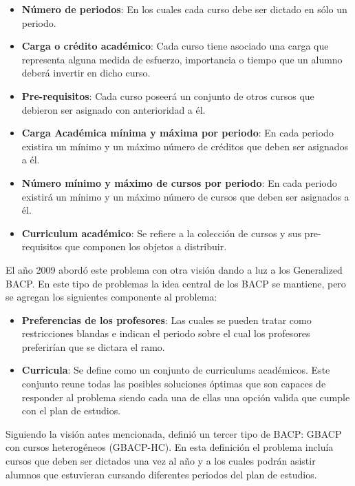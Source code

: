\documentclass[letter, 10pt]{article}
\begin{document}
\begin{itemize}
\item \textbf{Número de periodos}: En los cuales cada curso debe ser dictado en sólo un periodo.
\item \textbf{Carga o crédito académico}: Cada curso tiene asociado una carga
  que representa alguna medida de esfuerzo, importancia o tiempo que un alumno
  deberá invertir en dicho curso.
\item \textbf{Pre-requisitos}: Cada curso poseerá un conjunto de otros cursos
  que debieron ser asignado con anterioridad a él.
\item \textbf{Carga Académica mínima y máxima por periodo}: En cada periodo
  existira un mínimo y un máximo número de créditos que deben ser asignados a
  él.
\item \textbf{Número mínimo y máximo de cursos por periodo}: En cada periodo
  existirá un mínimo y un máximo número de cursos que deben ser asignados a él.
\item \textbf{Curriculum académico}: Se refiere a la colección de cursos y sus
  pre-requisitos que componen los objetos a distribuir.
\end{itemize}


El año 2009 \cite{chiarandini2012balanced} abordó este problema con otra
visión dando a luz a los Generalized BACP. En este tipo de problemas la
idea central de los BACP se mantiene, pero se agregan los siguientes
componente al problema:

\begin{itemize}
\item \textbf{Preferencias de los profesores}: Las cuales se pueden
  tratar como restricciones blandas e indican el periodo sobre el cual
  los profesores preferirían que se dictara el ramo.
\item \textbf{Curricula}: Se define como un conjunto de curriculums
  académicos. Este conjunto reune todas las posibles soluciones óptimas
  que son capaces de responder al problema siendo cada una de ellas una
  opción valida que cumple con el plan de estudios.
\end{itemize}

Siguiendo la visión antes mencionada, \cite{schaerfmodelling} definió un
tercer tipo de BACP: GBACP con cursos heterogéneos (GBACP-HC). En esta
definición el problema incluía cursos que deben ser dictados una vez al
año y a los cuales podrán asistir alumnos que estuvieran cursando
diferentes periodos del plan de estudios.
\end{document}

